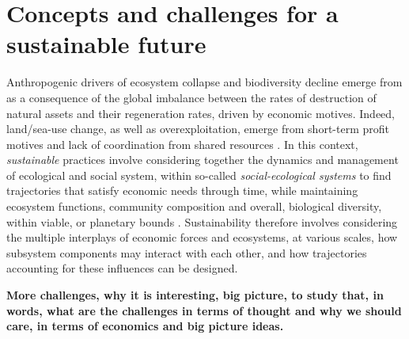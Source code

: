 \section*{Concepts and challenges for a sustainable future}

Anthropogenic drivers of ecosystem collapse and biodiversity decline emerge from as a consequence of the global imbalance between the rates of destruction of natural assets and their regeneration rates, driven by economic motives. Indeed, land/sea-use change, as well as overexploitation, emerge from short-term profit motives and lack of coordination from shared resources \citep{clark_profit_1973}. In this context, \textit{sustainable} practices involve considering together the dynamics and management of ecological and social system, within so-called \textit{social-ecological systems} \citep{Ostrom2009} to find trajectories that satisfy economic needs through time, while maintaining ecosystem functions, community composition and overall, biological diversity, within viable, or planetary bounds \citep{Dasgupta2007, steffen_2015_planetary}. Sustainability therefore involves considering the multiple interplays of economic forces and ecosystems, at various scales, how subsystem components may interact with each other, and how trajectories accounting for these influences can be designed. 

\textbf{More challenges, why it is interesting, big picture, to study that, in words, what are the challenges in terms of thought and why we should care, in terms of economics and big picture ideas.}



